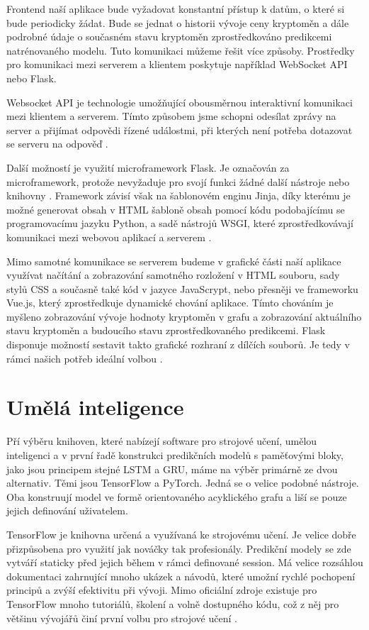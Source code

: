 Frontend naší aplikace bude vyžadovat konstantní přístup k datům, o které si bude periodicky žádat. 
Bude se jednat o historii vývoje ceny kryptoměn a dále podrobné údaje o současném stavu kryptoměn zprostředkováno predikcemi natrénovaného modelu. 
Tuto komunikaci můžeme řešit více způsoby. Prostředky pro komunikaci mezi serverem a klientem poskytuje například WebSocket API nebo Flask. 

Websocket API je technologie umožňující obousměrnou interaktivní komunikaci mezi klientem a serverem. 
Tímto způsobem jsme schopni odesílat zprávy na server a přijímat odpovědi řízené událostmi, při kterých není potřeba dotazovat se serveru na odpověď \cite{websocket}.

Další možností je využití microframework Flask. 
Je označován za microframework, protože nevyžaduje pro svojí funkci žádné další nástroje nebo knihovny \cite{micro}.
Framework závisí však na šablonovém enginu Jinja, díky kterému je možné generovat obsah v HTML šabloně obsah pomocí kódu podobajícímu se programovacímu jazyku Python, a sadě nástrojů WSGI, které zprostředkovávají komunikaci mezi webovou aplikací a serverem \cite{jinja, wsgi}.

Mimo samotné komunikace se serverem budeme v grafické části naší aplikace využívat načítání a zobrazování samotného rozložení v HTML souboru, sady stylů CSS a současně také kód v jazyce JavaScrypt, nebo přesněji ve frameworku Vue.js, který zprostředkuje dynamické chování aplikace.
Tímto chováním je myšleno zobrazování vývoje hodnoty kryptoměn v grafu a zobrazování aktuálního stavu kryptoměn a budoucího stavu zprostředkovaného predikcemi. 
Flask disponuje možností sestavit takto grafické rozhraní z dílčích souborů. 
Je tedy v rámci našich potřeb ideální volbou \cite{flask-html}.

\section{Umělá inteligence}

Pří výběru knihoven, které nabízejí software pro strojové učení, umělou inteligenci a v první řadě konstrukci predikčních modelů s paměťovými bloky, jako jsou principem stejné LSTM a GRU, máme na výběr primárně ze dvou alternativ. 
Těmi jsou TensorFlow a PyTorch. 
Jedná se o velice podobné nástroje. 
Oba konstruují model ve formě orientovaného acyklického grafu a liší se pouze jejich definování uživatelem.

TensorFlow je knihovna určená a využívaná ke strojovému učení. 
Je velice dobře přizpůsobena pro využití jak nováčky tak profesionály. 
Predikční modely se zde vytváří staticky před jejich během v rámci definované session. 
Má velice rozsáhlou dokumentaci zahrnující mnoho ukázek a návodů, které umožní rychlé pochopení principů a zvýší efektivitu při vývoji. 
Mimo oficiální zdroje existuje pro TensorFlow mnoho tutoriálů, školení a volně dostupného kódu, což z něj pro většinu vývojářů činí první volbu pro strojové učení \cite{tensorflow-tut}.

